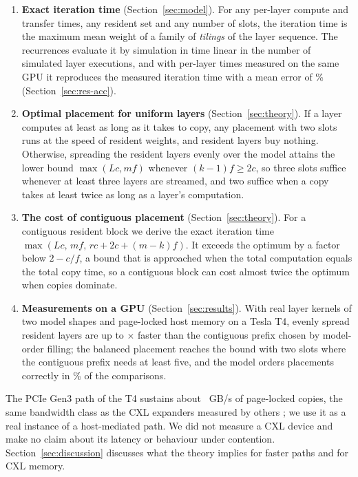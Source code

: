 \documentclass[final,5p,times,twocolumn]{elsarticle}
\theoremstyle{definition}
\begin{document}
\begin{enumerate}
\item \textbf{Exact iteration time} (Section~\ref{sec:model}). For any per-layer compute and transfer times, any resident set and any number of slots, the iteration time is the maximum mean weight of a family of \emph{tilings} of the layer sequence. The recurrences evaluate it by simulation in time linear in the number of simulated layer executions, and with per-layer times measured on the same GPU it reproduces the measured iteration time with a mean error of \nAccMape\% (Section~\ref{sec:res-acc}).
\item \textbf{Optimal placement for uniform layers} (Section~\ref{sec:theory}). If a layer computes at least as long as it takes to copy, any placement with two slots runs at the speed of resident weights, and resident layers buy nothing. Otherwise, spreading the resident layers evenly over the model attains the lower bound $\max(Lc, mf)$ whenever $(k-1)f\ge 2c$, so three slots suffice whenever at least three layers are streamed, and two suffice when a copy takes at least twice as long as a layer's computation.
\item \textbf{The cost of contiguous placement} (Section~\ref{sec:theory}). For a contiguous resident block we derive the exact iteration time $\max(Lc,\,mf,\,rc+2c+(m-k)f)$. It exceeds the optimum by a factor below $2-c/f$, a bound that is approached when the total computation equals the total copy time, so a contiguous block can cost almost twice the optimum when copies dominate.
\item \textbf{Measurements on a GPU} (Section~\ref{sec:results}). With real layer kernels of two model shapes and page-locked host memory on a Tesla T4, evenly spread resident layers are up to \nMeasPenaltyMax$\times$ faster than the contiguous prefix chosen by model-order filling; the balanced placement reaches the bound with two slots where the contiguous prefix needs at least five, and the model orders placements correctly in \nAccRankExact\% of the comparisons.
\end{enumerate}

The PCIe Gen3 path of the T4 sustains about \nHwBw~GB/s of page-locked copies, the same bandwidth class as the CXL expanders measured by others \cite{yoon2025tract,jang2026itme}; we use it as a real instance of a host-mediated path. We did not measure a CXL device and make no claim about its latency or behaviour under contention. Section~\ref{sec:discussion} discusses what the theory implies for faster paths and for CXL memory.
\end{document}
